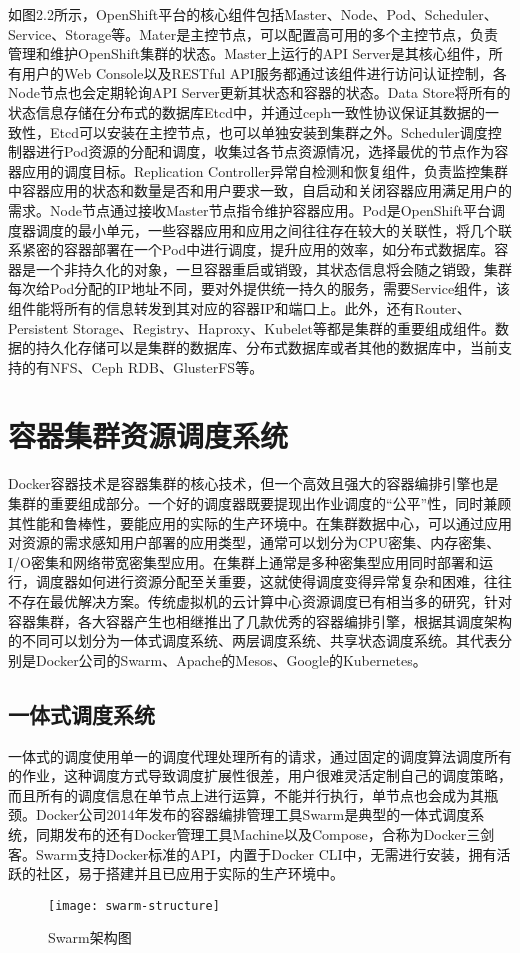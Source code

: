 如图2.2所示，OpenShift平台的核心组件包括Master、Node、Pod、Scheduler、Service、Storage等。Mater是主控节点，可以配置高可用的多个主控节点，负责管理和维护OpenShift集群的状态。Master上运行的API Server是其核心组件，所有用户的Web Console以及RESTful API服务都通过该组件进行访问认证控制，各Node节点也会定期轮询API Server更新其状态和容器的状态。Data Store将所有的状态信息存储在分布式的数据库Etcd中，并通过ceph一致性协议保证其数据的一致性，Etcd可以安装在主控节点，也可以单独安装到集群之外。Scheduler调度控制器进行Pod资源的分配和调度，收集过各节点资源情况，选择最优的节点作为容器应用的调度目标。Replication Controller异常自检测和恢复组件，负责监控集群中容器应用的状态和数量是否和用户要求一致，自启动和关闭容器应用满足用户的需求。Node节点通过接收Master节点指令维护容器应用。Pod是OpenShift平台调度器调度的最小单元，一些容器应用和应用之间往往存在较大的关联性，将几个联系紧密的容器部署在一个Pod中进行调度，提升应用的效率，如分布式数据库。容器是一个非持久化的对象，一旦容器重启或销毁，其状态信息将会随之销毁，集群每次给Pod分配的IP地址不同，要对外提供统一持久的服务，需要Service组件，该组件能将所有的信息转发到其对应的容器IP和端口上。此外，还有Router、Persistent Storage、Registry、Haproxy、Kubelet等都是集群的重要组成组件。数据的持久化存储可以是集群的数据库、分布式数据库或者其他的数据库中，当前支持的有NFS、Ceph RDB、GlusterFS等。

\section{容器集群资源调度系统}
\label{sec:scheduler}
Docker容器技术是容器集群的核心技术，但一个高效且强大的容器编排引擎也是集群的重要组成部分。一个好的调度器既要提现出作业调度的“公平”性，同时兼顾其性能和鲁棒性，要能应用的实际的生产环境中。在集群数据中心，可以通过应用对资源的需求感知用户部署的应用类型，通常可以划分为CPU密集、内存密集、I/O密集和网络带宽密集型应用。在集群上通常是多种密集型应用同时部署和运行，调度器如何进行资源分配至关重要，这就使得调度变得异常复杂和困难，往往不存在最优解决方案。传统虚拟机的云计算中心资源调度已有相当多的研究，针对容器集群，各大容器产生也相继推出了几款优秀的容器编排引擎，根据其调度架构的不同可以划分为一体式调度系统、两层调度系统、共享状态调度系统。其代表分别是Docker公司的Swarm、Apache的Mesos、Google的Kubernetes。

\subsection{一体式调度系统}
一体式的调度使用单一的调度代理处理所有的请求，通过固定的调度算法调度所有的作业，这种调度方式导致调度扩展性很差，用户很难灵活定制自己的调度策略，而且所有的调度信息在单节点上进行运算，不能并行执行，单节点也会成为其瓶颈。Docker公司2014年发布的容器编排管理工具Swarm是典型的一体式调度系统，同期发布的还有Docker管理工具Machine以及Compose，合称为Docker三剑客。Swarm支持Docker标准的API，内置于Docker CLI中，无需进行安装，拥有活跃的社区，易于搭建并且已应用于实际的生产环境中。
\begin{figure}[H] %
	\centering
	\texttt{[image: swarm-structure]}
	\caption{Swarm架构图}
\end{figure}

